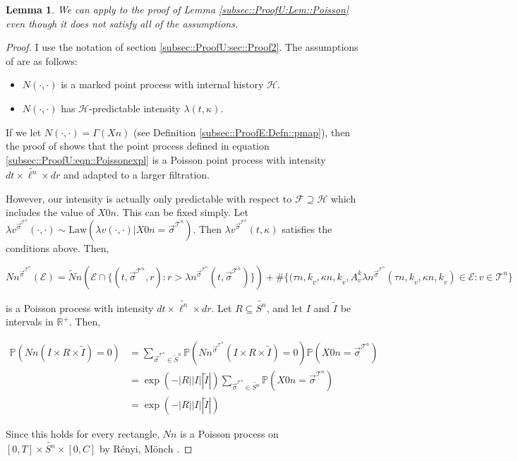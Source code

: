 \documentclass[12pt]{article}
\newcommand{\mb}{\mathbb}
\newcommand{\mc}{\mathcal}
\newcommand{\te}{\text}
\newcommand{\ind}{\hspace{24pt}}
\newcommand{\pr}{\mb{P}}							%
\renewcommand{\v}{v}							%
\renewcommand{\S}{S}							%
\newcommand{\s}{\sigma}							%
\newcommand{\sv}{\vec{\s}}						%
\renewcommand{\t}{t}							%
\newcommand{\F}{\mc{F}}							%
\newcommand{\FH}{\mc{H}}						%
\newcommand{\X}{X}								%
\newcommand{\carp}[1]{^{#1}}					%
\newcommand{\vsi}[1]{^{#1}}						%
\newcommand{\cind}[1]{_{#1}}					%
\newcommand{\const}{C}							%
\newcommand{\tree}{\mc{T}}						%
\newcommand{\sln}[1]{^{#1}}						%
\newcommand{\poiss}{N}							%
\newcommand{\Sm}{\ell}							%
\newcommand{\rate}{\lambda}						%
\renewcommand{\r}{r}							%
\newcommand{\alt}[1]{\widetilde{#1}}			%
\newcommand{\law}{\te{Law}}						%
\newcommand{\rt}{\tau}							%
\renewcommand{\it}{k}							%
\newcommand{\evnt}{\mc{E}}						%
\newcommand{\rv}{A}								%
\newcommand{\pmap}{\Gamma}						%
\renewcommand{\mark}{\kappa}					%
\newcommand{\inte}{I}							%
\newtheorem{lem}[thms]{Lemma}
\begin{document}
\begin{lem}
We can apply \cite[Proposition 14.7.I(b)]{DalVer08} to the proof of Lemma \ref{subsec::ProofU:Lem::Poisson} even though it does not satisfy all of the assumptions.
\label{sec::TL:Lem::embedding}
\end{lem}
\begin{proof}
I use the notation of section \ref{subsec::ProofU:sec::Proof2}. The assumptions of \cite[Proposition 14.7.I(b)]{DalVer08} are as follows:

\begin{itemize}
\item \(\poiss{}(\cdot,\cdot)\) is a marked point process with internal history \(\FH\).

\item \(\poiss{}(\cdot,\cdot)\) has \(\FH\)-predictable intensity \(\rate{}(\t,\mark)\).
\end{itemize}

If we let \(\poiss{}(\cdot,\cdot) = \pmap{}(\X{}{}{n})\) (see Definition \ref{subsec::ProofE:Defn::pmap}), then the proof of \cite[Proposition 14.7.I(b)]{DalVer08} shows that the point process defined in equation \eqref{subsec::ProofU:eqn::Poissonexpl} is a Poisson point process with intensity \(d\t\times \alt{\Sm^n}\times d\r\) and adapted to a larger filtration.

\ind However, our intensity is actually only predictable with respect to \(\F \supseteq \FH\) which includes the value of \(\X{}{0}{n}\). This can be fixed simply. Let \(\rate{\v}^{\sv\cind{}\vsi{\tree\sln{n}}}(\cdot,\cdot) \sim \law(\rate{\v}(\cdot,\cdot)|\X{}{0}{n} = \sv\cind{}\vsi{\tree\sln{n}})\). Then \(\rate{\v}^{\sv\cind{}\vsi{\tree\sln{n}}}(\t,\mark)\) satisfies the conditions above. Then,

\[\poiss{n}^{\sv\cind{}\vsi{\tree\sln{n}}}(\evnt{}) = \alt{\poiss}{n}\left(\evnt{}\cap\{(\t,\sv\cind{}\vsi{\tree\sln{n}},\r):\r > \rate{n}^{\sv\cind{}\vsi{\tree\sln{n}}}(\t,\sv\cind{}\vsi{\tree\sln{n}})\}\right) + \#\{(\rt{n,\it}_\v,\mark{n,\it}_\v,\rv_{\v}^{\it}\rate{n}^{\sv\cind{}\vsi{\tree\sln{n}}}(\rt{n,\it}_\v,\mark{n,\it}_\v) \in \evnt{}: \v\in \tree\sln{n}\}\]

is a Poisson process with intensity \(d\t\times \alt{\Sm^n}\times d\r\). Let \(R \subseteq \alt{\S\carp{n}}\), and let \(\inte\) and \(\alt{\inte}\) be intervals in \(\mb{R}^+\). Then,

\begin{align*}
\pr\left(\poiss{n}\left(\inte\times R\times \alt{\inte}\right) = 0\right) &= \sum_{\sv\cind{}\vsi{\tree\sln{n}} \in \alt{\S}^n} \pr\left(\poiss{n}^{\sv\cind{}\vsi{\tree\sln{n}}}\left(\inte\times R\times \alt{\inte}\right) = 0\right)\pr(\X{}{0}{n} = \sv\cind{}\vsi{\tree\sln{n}})\\
&= \exp\left(-|R| |\inte||\alt{\inte}|\right)\sum_{\sv\cind{}\vsi{\tree\sln{n}} \in \alt{\S\carp{n}}} \pr(\X{}{0}{n} = \sv\cind{}\vsi{\tree\sln{n}})\\
&=\exp\left(-|R| |\inte||\alt{\inte}|\right)
\end{align*}

Since this holds for every rectangle, \(\poiss{n}\) is a Poisson process on \([0,T]\times \alt{\S\carp{n}}\times [0,\const{}]\) by R\'enyi, M\"onch \cite[Theorem 9.2.XII]{DalVer08}.



\end{proof}
\newpage


\end{document}
